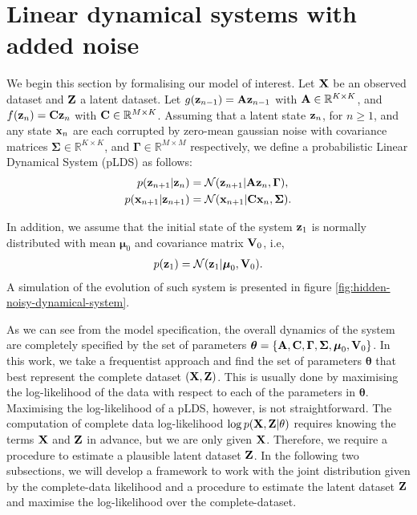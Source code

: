 \documentclass[11pt]{article}
\numberwithin{equation}{section}
\newcommand{\x}{{\bf x}}
\newcommand{\X}{{\bf X}}
\newcommand{\z}{{\bf z}}
\newcommand{\Z}{{\bf Z}}
\newcommand{\N}{\mathcal{N}}
\newcommand{\R}{\mathbb{R}}
\begin{document}
\section{Linear dynamical systems with added noise}
We begin this section by formalising our model of interest. Let $\X$ be an observed dataset and $\Z$ a latent dataset. Let $g(\z_{n-1}) = {\bf A} \z_{n-1}$ with ${\bf A}\in\R^{K\times K}$, and $f(\z_n) = {\bf C} \z_{n}$ with ${\bf C} \in \R^{M \times K}$. Assuming that a latent state $\z_n$, for $n \geq 1$, and any state $\x_n$ are each corrupted by zero-mean gaussian noise with covariance matrices $\boldsymbol{\Sigma} \in \mathbb{R}^{K \times K}$, and $\boldsymbol{\Gamma} \in \mathbb{R}^{M \times M}$ respectively, we define a  probabilistic Linear Dynamical System (pLDS) as follows:
\begin{align}
	p(\z_{n+1} \vert \z_n) &= \N(\z_{n+1} \vert {\bf A}\z_n, \boldsymbol\Gamma),\\
	p(\x_{n+1} \vert \z_{n+1}) &= \N(\x_{n+1} \vert {\bf C}\x_n, \boldsymbol\Sigma).
\end{align}

In addition, we assume that the initial state of the system $\z_1$ is normally distributed with mean $\boldsymbol{\mu}_0$ and covariance matrix ${\bf V}_0$, i.e,
\begin{align}
	p(\z_1) &= \N(\z_1 \vert \boldsymbol\mu_0, {\bf V}_0).\\
\end{align}
A simulation of the evolution of such system is presented in figure \ref{fig:hidden-noisy-dynamical-system}.

As we can see from the model specification, the overall dynamics of the system are completely specified by the set of parameters $\boldsymbol\theta = \{{\bf A}, {\bf C}, \boldsymbol\Gamma, \boldsymbol\Sigma, \boldsymbol\mu_0, {\bf V}_0\}$. In this work, we take a frequentist approach and find the set of parameters $\boldsymbol\theta$ that best represent the complete dataset $(\X, \Z)$. This is usually done by maximising the log-likelihood of the data with respect to each of the parameters in $\boldsymbol{\theta}$. Maximising the log-likelihood of a pLDS, however, is not straightforward. The computation of complete data log-likelihood $\log p(\X, \Z \vert \theta)$ requires knowing the terms $\X$ and $\Z$ in advance, but we are only given $\X$. Therefore, we require a procedure to estimate a plausible latent dataset $\Z$. In the following two subsections, we will develop a framework to work with the joint distribution given by the complete-data likelihood and a procedure to estimate the latent dataset $\Z$ and maximise the log-likelihood over the complete-dataset.
\end{document}
